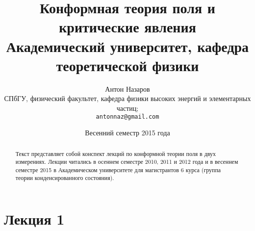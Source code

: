 \documentclass[a4paper,12pt]{article}
\title{Конформная теория поля и критические явления\\
\small{Академический университет, кафедра теоретической физики}
}
\author{Антон Назаров\\
  \small{СПбГУ, физический факультет, кафедра физики высоких энергий и элементарных частиц;}\\
  \texttt{antonnaz@gmail.com}
}
\date{Весенний семестр 2015 года}
\theoremstyle{definition}
\theoremstyle{definition}
\theoremstyle{definition}
\begin{document}
\maketitle
\thispagestyle{empty}
\begin{abstract}
  Текст представляет собой конспект лекций по конформной теории поля в двух измерениях. Лекции
  читались в осеннем семестре 2010, 2011 и 2012 года и в весеннем семестре 2015 в Академическом университете для
  магистрантов 6 курса (группа теории конденсированного состояния).
\end{abstract}
\tableofcontents

\section{Лекция 1}
\label{sec:lecture-1}
\end{document}
